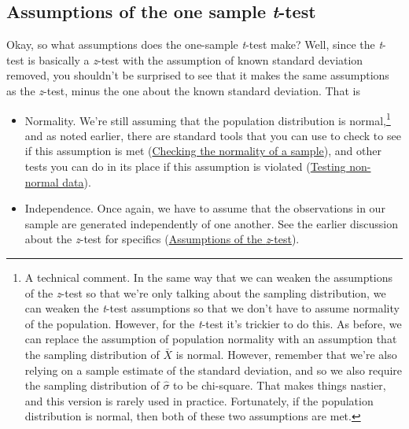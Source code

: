\documentclass[
  a4paper,
]{book}
\providecommand{\tightlist}{%
  \setlength{\itemsep}{0pt}\setlength{\parskip}{0pt}}\usepackage{longtable,booktabs,array}
\begin{document}
\hypertarget{assumptions-of-the-one-sample-t-test}{%
\subsection{\texorpdfstring{Assumptions of the one sample
\emph{t}-test}{Assumptions of the one sample t-test}}\label{assumptions-of-the-one-sample-t-test}}

Okay, so what assumptions does the one-sample \emph{t}-test make? Well,
since the \emph{t}-test is basically a \emph{z}-test with the assumption
of known standard deviation removed, you shouldn't be surprised to see
that it makes the same assumptions as the \emph{z}-test, minus the one
about the known standard deviation. That is

\begin{itemize}
\tightlist
\item
  Normality. We're still assuming that the population distribution is
  normal,\footnote{A technical comment. In the same way that we can
    weaken the assumptions of the \emph{z}-test so that we're only
    talking about the sampling distribution, we can weaken the
    \emph{t}-test assumptions so that we don't have to assume normality
    of the population. However, for the \emph{t}-test it's trickier to
    do this. As before, we can replace the assumption of population
    normality with an assumption that the sampling distribution of
    \(\bar{X}\) is normal. However, remember that we're also relying on
    a sample estimate of the standard deviation, and so we also require
    the sampling distribution of \(\hat{\sigma}\) to be chi-square. That
    makes things nastier, and this version is rarely used in practice.
    Fortunately, if the population distribution is normal, then both of
    these two assumptions are met.} and as noted earlier, there are
  standard tools that you can use to check to see if this assumption is
  met
  (\protect\hyperlink{sec-Checking-the-normality-of-a-sample}{Checking
  the normality of a sample}), and other tests you can do in its place
  if this assumption is violated
  (\protect\hyperlink{testing-non-normal-data}{Testing non-normal
  data}).
\item
  Independence. Once again, we have to assume that the observations in
  our sample are generated independently of one another. See the earlier
  discussion about the \emph{z}-test for specifics
  (\protect\hyperlink{assumptions-of-the-z-test}{Assumptions of the
  \emph{z}-test}).
\end{itemize}
\end{document}
